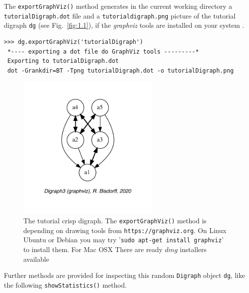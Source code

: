 The \texttt{exportGraphViz()} method generates in the current working directory a \texttt{tutorialDigraph.dot} file and a \texttt{tutorialdigraph.png} picture of the tutorial digraph \texttt{dg} (see Fig.~\vref{fig:1.1}), if the \emph{graphviz} tools are installed on your system \citep{graphViz}.
\begin{lstlisting}
>>> dg.exportGraphViz('tutorialDigraph')
 *---- exporting a dot file do GraphViz tools ---------*
 Exporting to tutorialDigraph.dot
 dot -Grankdir=BT -Tpng tutorialDigraph.dot -o tutorialDigraph.png
\end{lstlisting}
\begin{figure}[h]
\sidecaption[t]
\includegraphics[width=7cm]{Figures/1-1-tutorialDigraph.pdf}
\caption{The tutorial crisp digraph. The \texttt{exportGraphViz()} method is depending on drawing tools from \texttt{https://graphviz.org}. On Linux Ubuntu or Debian you may try '\texttt{sudo apt-get install graphviz}’ to install them. For Mac OSX There are ready $dmg$ installers available}
\label{fig:1.1}       %
\end{figure}

Further methods are provided for inspecting this random \texttt{Digraph} object \texttt{dg}, like the following \texttt{showStatistics()} method.

